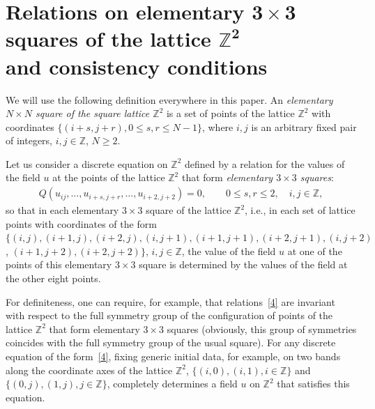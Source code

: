 \section[Relations on elementary $3 \times 3$ squares of the
lattice $\mathbb{Z}^2$ and consistency conditions]{Relations on elementary $\boldsymbol{3 \times 3}$ squares of the
lattice $\boldsymbol{\mathbb{Z}^2}$\\ and consistency conditions}



We will use the following def\/inition everywhere in this paper. An
{\it elementary $N \times N$ square of the square lattice
$\mathbb{Z}^2$} is a set of points of the lattice $\mathbb{Z}^2$
with coordinates $\{(i + s, j + r), 0 \leq s, r \leq N - 1\}$,
where $i, j$ is an arbitrary f\/ixed pair of integers, $i, j \in
\mathbb{Z}$, $N \geq 2$.





Let us consider a discrete equation on $\mathbb{Z}^2$ def\/ined by a
relation for the values of the f\/ield $u$ at the points of the
lattice $\mathbb{Z}^2$ that form {\it elementary $3 \times 3$
squares}:
\begin{gather} Q (u_{i j}, \ldots, u_{i + s, j + r}, \ldots, u_{i +
2, j + 2}) = 0, \qquad  0 \leq s, r \leq 2, \quad i, j \in \mathbb{Z},
\label{4}\end{gather}
so that in each elementary $3 \times 3$ square of the
lattice $\mathbb{Z}^2$, i.e., in each set of lattice points with
coordinates of the form $\{(i, j), (i + 1, j), (i + 2, j), (i, j +
1), (i + 1, j + 1), (i + 2, j + 1), (i, j + 2)$, $(i + 1, j + 2), (i +
2, j + 2)\}$, $i, j \in \mathbb{Z}$, the value of the f\/ield $u$ at
one of the points of this elementary $3 \times 3$ square is
determined by the values of the f\/ield at the other eight points.


For def\/initeness, one can require, for example, that relations~\eqref{4}
are invariant with respect to the full symmetry group of
the conf\/iguration of points of the lattice $\mathbb{Z}^2$ that form
elementary $3 \times 3$ squares (obviously, this group of symmetries
coincides with the full symmetry group of the usual square). For any
discrete equation of the form~\eqref{4}, f\/ixing generic initial
data, for example, on two bands along the coordinate axes of the
lattice $\mathbb{Z}^2$, $\{(i, 0), (i, 1), i \in \mathbb{Z} \}$ and
$\{(0, j), (1, j), j \in \mathbb{Z} \}$, completely determines a
f\/ield $u$ on $\mathbb{Z}^2$ that satisf\/ies this equation.


